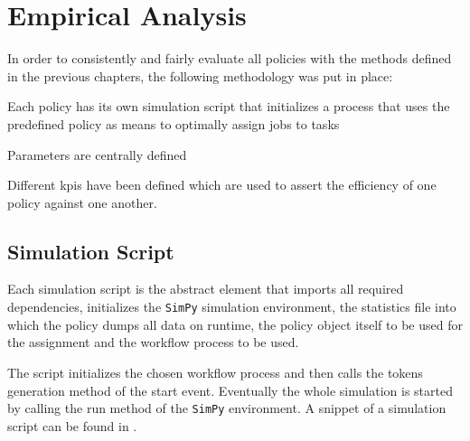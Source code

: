 \chapter{Empirical Analysis}
\label{ch:empirical_analysis}

In order to consistently and fairly evaluate all policies with the methods defined in the previous chapters, the following methodology was put in place:
\begin{enumerate*}
	\item Each policy has its own simulation script that initializes a process that uses the predefined policy as means to optimally assign jobs to tasks
	\item Parameters are centrally defined
	\item Different \glspl{kpi} have been defined which are used to assert the efficiency of one policy against one another.
\end{enumerate*}

\section{Simulation Script}

Each simulation script is the abstract element that imports all required dependencies, initializes the \texttt{SimPy} simulation environment, the statistics file into which the policy dumps all data on runtime, the policy object itself to be used for the assignment and the workflow process to be used. 

The script initializes the chosen workflow process and then calls the tokens generation method of the start event. Eventually the whole simulation is started by calling the run method of the \texttt{SimPy} environment. A snippet of a simulation script can be found in .

